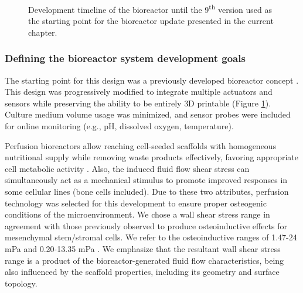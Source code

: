 \begin{figure}
\caption{Development timeline of the bioreactor until the 9\textsuperscript{th} version used as the starting point for the bioreactor update presented in the current chapter.}
\label{figStory}
\end{figure}


\subsubsection{Defining the bioreactor system development goals}
The starting point for this design was a previously developed bioreactor concept \cite{Meneses2020-dx, Meneses2022-rx}. This design was progressively modified to integrate multiple actuators and sensors while preserving the ability to be entirely \acs{3D} printable (Figure \ref{figStory}). Culture medium volume usage was minimized, and sensor probes were included for online monitoring (e.g., pH, dissolved oxygen, temperature).

Perfusion bioreactors allow reaching cell-seeded scaffolds with homogeneous nutritional supply while removing waste products effectively, favoring appropriate cell metabolic activity \cite{Shakeel2013-vo, Gaspar2012-uz}. Also, the induced fluid flow shear stress can simultaneously act as a mechanical stimulus to promote improved responses in some cellular lines (bone cells included). Due to these two attributes, perfusion technology was selected for this development to ensure proper osteogenic conditions of the microenvironment. We chose a wall shear stress range in agreement with those previously observed to produce osteoinductive effects for mesenchymal stem/stromal cells. We refer to the osteoinductive ranges of 1.47-24 \unit{\milli\pascal} \cite{Vetsch2017-zd} and 0.20-13.35 \unit{\milli\pascal} \cite{Yamada2021-qf}. We emphasize that the resultant wall shear stress range is a product of the bioreactor-generated fluid flow characteristics, being also influenced by the scaffold properties, including its geometry and surface topology.

